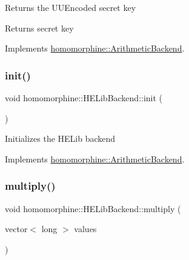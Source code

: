 Returns the U\+U\+Encoded secret key

\begin{DoxyReturn}{Returns}
secret key 
\end{DoxyReturn}


Implements \mbox{\hyperlink{classhomomorphine_1_1_arithmetic_backend_a679abf60fea83922f7972498c4500252}{homomorphine\+::\+Arithmetic\+Backend}}.

\mbox{\label{classhomomorphine_1_1_h_e_lib_backend_a6a7e7c8095f2287c41f7d93be91418ec}} 
\subsubsection{\texorpdfstring{init()}{init()}}
{\footnotesize\ttfamily void homomorphine\+::\+H\+E\+Lib\+Backend\+::init (\begin{DoxyParamCaption}{ }\end{DoxyParamCaption})\hspace{0.3cm}{\ttfamily [virtual]}}

Initializes the H\+E\+Lib backend 

Implements \mbox{\hyperlink{classhomomorphine_1_1_arithmetic_backend_a2654ee62a6cf2f16fd41c834a26b0006}{homomorphine\+::\+Arithmetic\+Backend}}.

\mbox{\label{classhomomorphine_1_1_h_e_lib_backend_a05b508bcc4a165d045ebc09f190c5a95}} 
\subsubsection{\texorpdfstring{multiply()}{multiply()}\hspace{0.1cm}{\footnotesize\ttfamily [1/2]}}
{\footnotesize\ttfamily void homomorphine\+::\+H\+E\+Lib\+Backend\+::multiply (\begin{DoxyParamCaption}\item[{vector$<$ long $>$}]{values }\end{DoxyParamCaption})\hspace{0.3cm}{\ttfamily [virtual]}}

